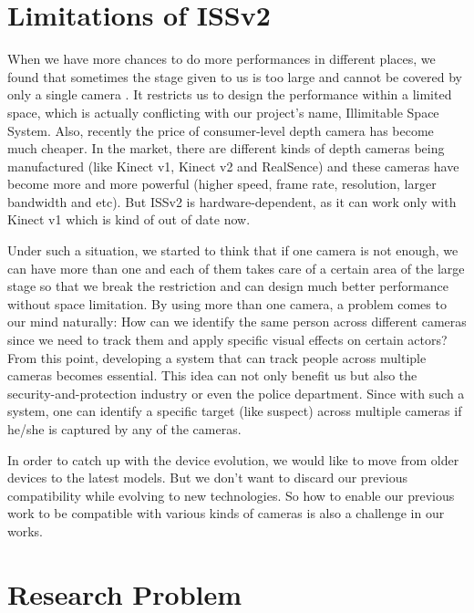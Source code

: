 \section{Limitations of ISSv2}
\label{sec:intro-lim-issv2}

When we have more chances to do more performances in different places,
we found that sometimes the stage given to us is too large and cannot be covered
by only a single camera \cite{iss-ascension-dance-show-2014, 
iss-gray-zone-dance-show-2015}. It restricts us to design the performance 
within a limited space, which is actually conflicting with our project's name, 
Illimitable Space System.
Also, recently the price of consumer-level depth camera has become
much cheaper. In the market, there are different kinds of depth cameras
being manufactured (like Kinect v1, Kinect v2 and RealSence) and these cameras
have become more and more powerful (higher speed, frame rate, resolution, larger
bandwidth and etc). But ISSv2 is hardware-dependent, as it can work only with 
Kinect v1 which is kind of out of date now.

Under such a situation, we started to think that if one camera is
not enough, we can have more than one and each of them takes care of a certain
area of the large stage so that we break the restriction and can design much
better performance without space limitation.
By using more than one camera, a problem comes to our mind naturally: How can
we identify the same person across different cameras since we need to track them
and apply specific visual effects on certain actors?
From this point, developing a system that can track people across multiple
cameras becomes essential.
This idea can not only benefit us but also the security-and-protection industry
or even the police department. Since with such a system, one can identify a
specific target (like suspect) across multiple cameras if he/she is captured by 
any of the cameras.

In order to catch up with the device evolution, we would like to move from 
older devices to the latest models. But we don't want to discard our previous 
compatibility while evolving to new technologies. So how to enable our previous 
work to be compatible with various kinds of cameras is also a challenge in our 
works.

\section{Research Problem}
\label{sec:intro-pbstat}

